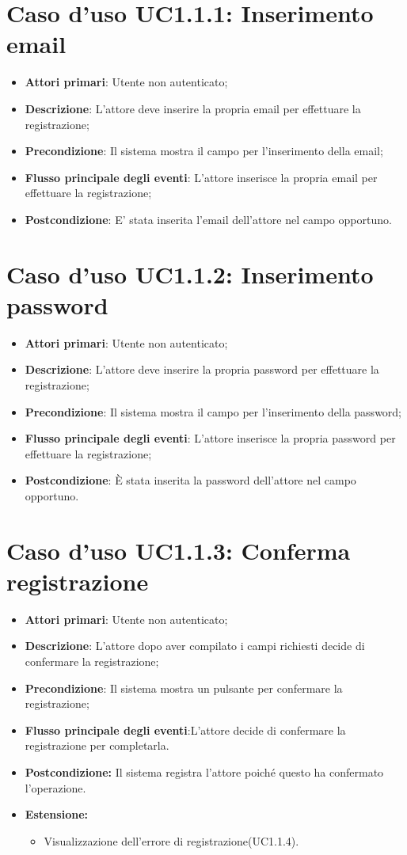 		\section{Caso d'uso UC1.1.1: Inserimento email}
\begin{itemize}
	\item \textbf{Attori primari}: Utente non autenticato;
	\item \textbf{Descrizione}: L'attore deve inserire la propria email per effettuare la  registrazione;
	\item \textbf{Precondizione}: Il sistema mostra il campo per l'inserimento della email;
	\item \textbf{Flusso principale degli eventi}: L'attore inserisce la propria email per effettuare la registrazione;
	\item \textbf{Postcondizione}: E' stata inserita l'email dell'attore nel campo opportuno.
\end{itemize}
\section{Caso d'uso UC1.1.2: Inserimento password}
\begin{itemize}
	\item \textbf{Attori primari}: Utente non autenticato;
	\item \textbf{Descrizione}: L'attore deve inserire la propria password per effettuare la registrazione;
	\item \textbf{Precondizione}: Il sistema mostra il campo per l'inserimento della password;
	\item \textbf{Flusso principale degli eventi}: L'attore inserisce la propria password per effettuare la registrazione;
	\item \textbf{Postcondizione}: È stata inserita la password dell'attore nel campo opportuno.
\end{itemize}

\section{Caso d'uso UC1.1.3: Conferma registrazione}
\begin{itemize}
	\item \textbf{Attori primari}: Utente non autenticato;
	\item \textbf{Descrizione}: L'attore dopo aver compilato i campi richiesti decide di confermare  la registrazione;
	\item \textbf{Precondizione}: Il sistema mostra un pulsante per confermare la registrazione;
	\item \textbf{Flusso principale degli eventi}:L'attore decide di confermare la registrazione per completarla.
	\item \textbf{Postcondizione:} Il sistema registra l'attore poiché questo ha confermato l'operazione.
	\item \textbf{Estensione:}
	\begin{itemize}
		\item Visualizzazione dell'errore di registrazione(UC1.1.4).
	\end{itemize}
\end{itemize}


